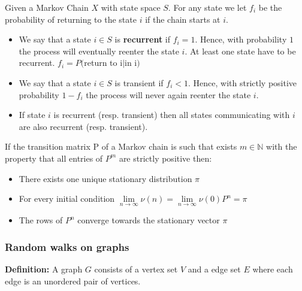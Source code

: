 Given a Markov Chain $X$ with state space $S$. For any state we let $f_i$ be the probability of returning to the state $i$ if the chain starts at $i$.

\begin{itemize}
\item We say that a state $i \in S$ is \textbf{recurrent} if $f_i=1$. Hence, with probability $1$ the process will eventually reenter the state $i$. At least one state have to be recurrent. $f_i=P($return to i$|$in i$)$
\item We say that a state $i \in S$ is transient if $f_i<1$. Hence, with strictly positive probability $1-f_i$ the process will never again reenter the state $i$.
\item If state $i$ is recurrent (resp. transient) then all states communicating with $i$ are also recurrent (resp. transient).
\end{itemize}


If the transition matrix P of a Markov chain is such that exists $m \in \mathbb{N}$ with the property that all entries of $P^m$ are strictly positive then:
\begin{itemize}
\item There exists one unique stationary distribution $\pi$
\item For every initial condition $\lim\limits_{n\rightarrow \infty}{\nu(n)}=\lim\limits_{n\rightarrow \infty}{\nu(0)P^n}=\pi$
\item The rows of $P^n$ converge towards the stationary vector $\pi$
\end{itemize}

\vfill

\subsubsection{Random walks on graphs}

\textbf{Definition: } A graph $G$ consists of a vertex set $V$ and a edge set $E$ where each edge is an unordered pair of vertices.

\vspace{0.25cm}

